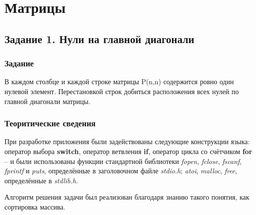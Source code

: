 \documentclass[12pt,a4paper]{report}
\begin{document}
%
\chapter{Матрицы}
\section{Задание 1. Нули на главной диагонали}
\subsection{Задание}
\hspace{\parindent}
В каждом столбце и каждой строке матрицы P(n,n) содержится ровно один нулевой элемент. Перестановкой строк добиться расположения всех нулей по главной диагонали матрицы.
\subsection{Теоритические сведения}
\hspace{\parindent}
При разработке приложения были задействованы следующие конструкции языка: оператор выбора \textbf{switch}, оператор ветвления \textbf{if}, оператор цикла со счётчиком \textbf{for} -- и были использованы функции стандартной библиотеки \textit{fopen}, \textit{fclose}, \textit{fscanf}, \textit{fprintf} и \textit{puts}, определённые в заголовочном файле \textit{stdio.h}; \textit{atoi}, \textit{malloc}, \textit{free}, определённые в \textit{stdlib.h}.

\hspace{\parindent}
Алгоритм решения задачи был реализован благодаря знанию такого понятия, как сортировка массива.
\end{document}
